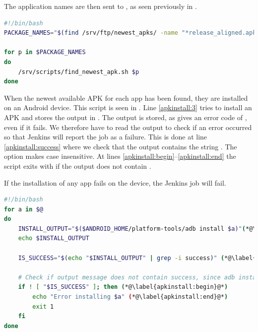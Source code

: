 The application names are then sent to , as seen previously in .

\begin{lstlisting}[float=tbp,language=bash,showstringspaces=false,caption=Bash script that finds the newest available APK for all apps,label=lst:find_all_newest_apks]
#!/bin/bash
PACKAGE_NAMES="$(find /srv/ftp/newest_apks/ -name "*release_aligned.apk" | sed 's:.*/::' | sed 's:_v.*::' | sort | uniq)"

for p in $PACKAGE_NAMES
do
    /srv/scripts/find_newest_apk.sh $p
done
\end{lstlisting}

When the newest available APK for each app has been found, they are installed on an Android device. This script is seen in . Line \ref{apkinstall:3} tries to install an APK and stores the output in . The output is stored, as  gives an error code of , even if it fails. We therefore have to read the output to check if an error occurred so that Jenkins will report the job as a failure. This is done at line \ref{apkinstall:success} where we check that the output contains the string . The  option makes  case insensitive. At lines \ref{apkinstall:begin}--\ref{apkinstall:end} the script exits with  if the output does not contain .

If the installation of any app fails on the device, the Jenkins job will fail.

\begin{lstlisting}[float=tbp,language=bash,showstringspaces=false,caption=Bash script that installs the given APKs to an Android device,label=lst:install_apks_on_android_device]
#!/bin/bash
for a in $@
do
    INSTALL_OUTPUT="$($ANDROID_HOME/platform-tools/adb install $a)"(*@\label{apkinstall:3}@*)
    echo $INSTALL_OUTPUT

    IS_SUCCESS="$(echo "$INSTALL_OUTPUT" | grep -i success)" (*@\label{apkinstall:success}@*)

    # Check if output message does not contain success, since adb install does not provide exit code != 0 at failure
    if ! [ "$IS_SUCCESS" ]; then (*@\label{apkinstall:begin}@*)
        echo "Error installing $a" (*@\label{apkinstall:end}@*)
        exit 1
    fi
done
\end{lstlisting}